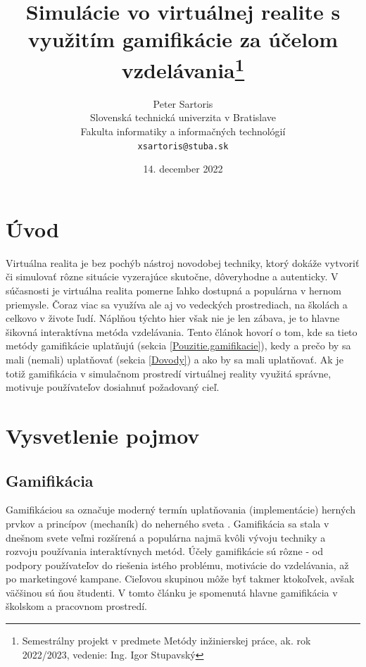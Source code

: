 \documentclass[10pt,slovak,a4paper]{article}
\title{Simulácie vo virtuálnej realite s využitím gamifikácie za účelom vzdelávania\thanks{Semestrálny projekt v predmete Metódy inžinierskej práce, ak. rok 2022/2023, vedenie: Ing. Igor Stupavský}}
\author{Peter Sartoris\\[2pt]
	{\small Slovenská technická univerzita v Bratislave}\\
	{\small Fakulta informatiky a informačných technológií}\\
	{\small \texttt{xsartoris@stuba.sk}}
	}
\date{\small 14. december 2022}
\begin{document}
\maketitle


\section{Úvod} \label{Abstract}

Virtuálna realita je bez pochýb nástroj novodobej techniky, ktorý dokáže vytvoriť či simulovať rôzne situácie vyzerajúce skutočne, dôveryhodne a autenticky.
V súčasnosti je virtuálna realita pomerne ľahko dostupná a populárna v hernom priemysle. Čoraz viac sa využíva ale aj vo vedeckých prostrediach, na školách a celkovo v živote ľudí. 
Náplňou týchto hier však nie je len zábava, je to hlavne šikovná interaktívna metóda vzdelávania.
Tento článok hovorí o tom, kde sa tieto metódy gamifikácie uplatňujú (sekcia \ref{Pouzitie.gamifikacie}), kedy a prečo by sa mali (nemali) uplatňovať (sekcia \ref{Dovody}) a ako by sa mali uplatňovať. 
Ak je totiž gamifikácia v simulačnom prostredí  virtuálnej reality využitá správne, motivuje používateľov dosiahnuť požadovaný cieľ.


\section{Vysvetlenie pojmov} \label{Vysvetlenie.pojmov}

\subsection{Gamifikácia} \label{Gamifikacia.vysvetlenie}

Gamifikáciou sa označuje moderný termín uplatňovania (implementácie) herných prvkov a princípov (mechaník) do neherného sveta \cite{marczewski2013gamification}. Gamifikácia sa stala v dnešnom svete veľmi rozšírená a populárna najmä kvôli vývoju techniky a rozvoju používania interaktívnych metód. Účely gamifikácie sú rôzne - od podpory používateľov do riešenia istého problému, motivácie do vzdelávania, až po marketingové kampane. Cieľovou skupinou môže byť takmer ktokoľvek, avšak väčšinou sú ňou študenti. V tomto článku je spomenutá hlavne gamifikácia v školskom a pracovnom prostredí. \newline \newline
\end{document}
